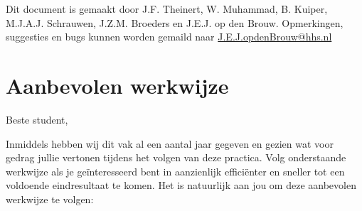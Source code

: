 \documentclass[a4paper,10pt,fleqn,twoside]{article}
\begin{document}
\tableofcontents

\vfill
Dit document is gemaakt door J.F. Theinert, W. Muhammad, B. Kuiper, M.J.A.J. Schrauwen, J.Z.M. Broeders en J.E.J. op den Brouw.
Opmerkingen, suggesties en bugs kunnen worden gemaild naar \href{mailto:J.E.J.opdenBrouw@hhs.nl}{J.E.J.opdenBrouw@hhs.nl}



\section*{Aanbevolen werkwijze}

Beste student,

Inmiddels hebben wij dit vak al een aantal jaar gegeven en gezien wat voor gedrag jullie vertonen tijdens het volgen van deze practica. Volg onderstaande werkwijze als je geïnteresseerd bent in aanzienlijk efficiënter en sneller tot een voldoende eindresultaat te komen. Het is natuurlijk aan jou om deze aanbevolen werkwijze te volgen:
\end{document}
